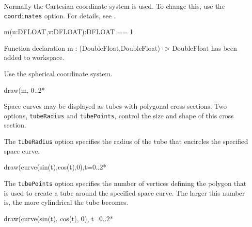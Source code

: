 %
Normally the Cartesian coordinate system is used.
To change this, use the {\tt coordinates} option.
For details, see .
%
%
\begin{xtc}
\begin{xtccomment}
\end{xtccomment}
\begin{spadsrc}
m(u:DFLOAT,v:DFLOAT):DFLOAT == 1 
\end{spadsrc}
\begin{MessageOutput}
   Function declaration m : (DoubleFloat,DoubleFloat) -> DoubleFloat 
      has been added to workspace.
\end{MessageOutput}
\end{xtc}
\begin{psXtc}
\begin{xtccomment}
Use the spherical
coordinate system.
\end{xtccomment}
\begin{spadsrc}
draw(m, 0..2*%
\end{spadsrc}
\end{psXtc}
%
Space curves may be displayed as tubes with polygonal cross sections.
Two options, {\tt tubeRadius} and {\tt tubePoints},  control the size and
shape of this cross section.
%
\begin{psXtc}
\begin{xtccomment}
The {\tt tubeRadius} option specifies the radius of the tube that
encircles the specified space curve.
\end{xtccomment}
\begin{spadsrc}
draw(curve(sin(t),cos(t),0),t=0..2*%
\end{spadsrc}
\end{psXtc}
%
%
\begin{psXtc}
\begin{xtccomment}
The {\tt tubePoints} option specifies the number of vertices
defining the polygon that is used to create a tube around the
specified space curve.
The larger this number is, the more cylindrical the tube becomes.
\end{xtccomment}
\begin{spadsrc}
draw(curve(sin(t), cos(t), 0), t=0..2*%
\end{spadsrc}
\end{psXtc}
